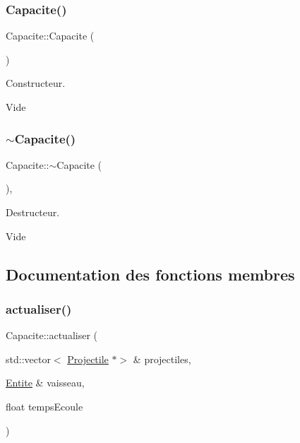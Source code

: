 \subsubsection{\texorpdfstring{Capacite()}{Capacite()}}
{\footnotesize\ttfamily Capacite\+::\+Capacite (\begin{DoxyParamCaption}{ }\end{DoxyParamCaption})\hspace{0.3cm}{\ttfamily [default]}}



Constructeur. 

Vide \mbox{\label{class_capacite_a43be1570a24a64682ff3f034330779a9}} 
\subsubsection{\texorpdfstring{$\sim$\+Capacite()}{~Capacite()}}
{\footnotesize\ttfamily Capacite\+::$\sim$\+Capacite (\begin{DoxyParamCaption}{ }\end{DoxyParamCaption})\hspace{0.3cm}{\ttfamily [virtual]}, {\ttfamily [default]}}



Destructeur. 

Vide 

\subsection{Documentation des fonctions membres}
\mbox{\label{class_capacite_a75c9621d7a704fedb10ad29c6a697d64}} 
\subsubsection{\texorpdfstring{actualiser()}{actualiser()}}
{\footnotesize\ttfamily Capacite\+::actualiser (\begin{DoxyParamCaption}\item[{std\+::vector$<$ \hyperlink{class_projectile}{Projectile} $\ast$$>$ \&}]{projectiles,  }\item[{\hyperlink{class_entite}{Entite} \&}]{vaisseau,  }\item[{float}]{temps\+Ecoule }\end{DoxyParamCaption})\hspace{0.3cm}{\ttfamily [pure virtual]}}



